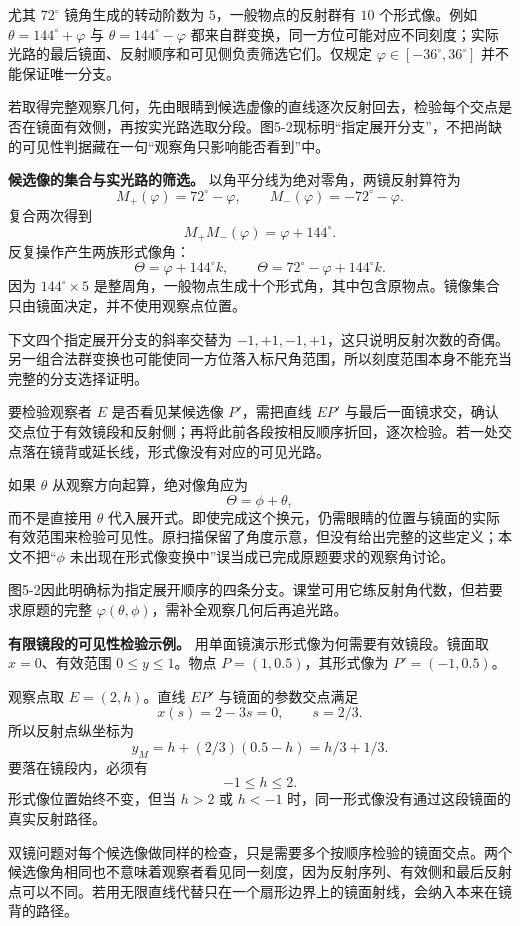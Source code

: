 \documentclass[12pt,a4paper,UTF8]{ctexart}
\begin{document}
尤其 \(72^\circ\) 镜角生成的转动阶数为 \(5\)，一般物点的反射群有 \(10\)
个形式像。例如 \(\theta=144^\circ+\varphi\) 与
\(\theta=144^\circ-\varphi\)
都来自群变换，同一方位可能对应不同刻度；实际光路的最后镜面、反射顺序和可见侧负责筛选它们。仅规定
\(\varphi\in[-36^\circ,36^\circ]\) 并不能保证唯一分支。

若取得完整观察几何，先由眼睛到候选虚像的直线逐次反射回去，检验每个交点是否在镜面有效侧，再按实光路选取分段。图5-2现标明``指定展开分支''，不把尚缺的可见性判据藏在一句``观察角只影响能否看到''中。

\textbf{候选像的集合与实光路的筛选。}
以角平分线为绝对零角，两镜反射算符为 \[
M_+(\varphi)=72^\circ-\varphi,\qquad
M_-(\varphi)=-72^\circ-\varphi.
\] 复合两次得到 \[
M_+M_-(\varphi)=\varphi+144^\circ.
\] 反复操作产生两族形式像角： \[
\Theta=\varphi+144^\circ k,
\qquad
\Theta=72^\circ-\varphi+144^\circ k.
\] 因为 \(144^\circ\times5\)
是整周角，一般物点生成十个形式角，其中包含原物点。镜像集合只由镜面决定，并不使用观察点位置。

下文四个指定展开分支的斜率交替为
\(-1,+1,-1,+1\)，这只说明反射次数的奇偶。另一组合法群变换也可能使同一方位落入标尺角范围，所以刻度范围本身不能充当完整的分支选择证明。

要检验观察者 \(E\) 是否看见某候选像 \(P'\)，需把直线 \(EP'\)
与最后一面镜求交，确认交点位于有效镜段和反射侧；再将此前各段按相反顺序折回，逐次检验。若一处交点落在镜背或延长线，形式像没有对应的可见光路。

如果 \(\theta\) 从观察方向起算，绝对像角应为 \[
\Theta=\phi+\theta,
\] 而不是直接用 \(\theta\)
代入展开式。即使完成这个换元，仍需眼睛的位置与镜面的实际有效范围来检验可见性。原扫描保留了角度示意，但没有给出完整的这些定义；本文不把``\(\phi\)
未出现在形式像变换中''误当成已完成原题要求的观察角讨论。

图5-2因此明确标为指定展开顺序的四条分支。课堂可用它练反射角代数，但若要求原题的完整
\(\varphi(\theta,\phi)\)，需补全观察几何后再追光路。

\textbf{有限镜段的可见性检验示例。}
用单面镜演示形式像为何需要有效镜段。镜面取 \(x=0\)、有效范围
\(0\le y\le1\)。物点 \(P=(1,0.5)\)，其形式像为 \(P'=(-1,0.5)\)。

观察点取 \(E=(2,h)\)。直线 \(EP'\) 与镜面的参数交点满足 \[
x(s)=2-3s=0,\qquad s=2/3.
\] 所以反射点纵坐标为 \[
y_M=h+(2/3)(0.5-h)=h/3+1/3.
\] 要落在镜段内，必须有 \[
-1\le h\le2.
\] 形式像位置始终不变，但当 \(h>2\) 或 \(h<-1\)
时，同一形式像没有通过这段镜面的真实反射路径。

双镜问题对每个候选像做同样的检查，只是需要多个按顺序检验的镜面交点。两个候选像角相同也不意味着观察者看见同一刻度，因为反射序列、有效侧和最后反射点可以不同。若用无限直线代替只在一个扇形边界上的镜面射线，会纳入本来在镜背的路径。
\end{document}
